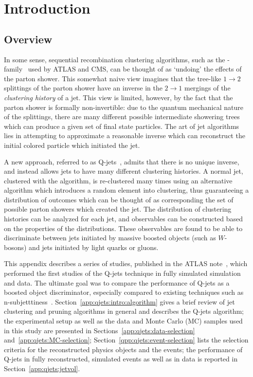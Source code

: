 \label{appendix:qjets}

\section{Introduction}

\subsection{Overview}
\label{app:qjets:intro:overview}

In some sense, sequential recombination clustering algorithms, such as the \kt-family~\cite{Ellis:1993tq} used by ATLAS and CMS, can be thought of as `undoing' the effects of the parton shower. This somewhat naive view imagines that the tree-like $1\rightarrow2$ splittings of the parton shower have an inverse in the $2\rightarrow1$ mergings of the \textit{clustering history} of a jet. This view is limited, however, by the fact that the parton shower is formally non-invertible: due to the quantum mechanical nature of the splittings, there are many different possible intermediate showering trees which can produce a given set of final state particles. The art of jet algorithms lies in attempting to approximate a reasonable inverse which can reconstruct the initial colored particle which initiated the jet.

A new approach, referred to as Q-jets~\cite{Ellis:2012sn}, admits that there is no unique inverse, and instead allows jets to have many different clustering histories. A normal jet, clustered with the \antikt algorithm, is re-clustered many times using an alternative algorithm which introduces a random element into clustering, thus guaranteeing a distribution of outcomes which can be thought of as corresponding the set of possible parton showers which created the jet. The distribution of clustering histories can be analyzed for each jet, and observables can be constructed based on the properties of the distributions. These observables are found to be able to discriminate between jets initiated by massive boosted objects (such as $W$-bosons) and jets initiated by light quarks or gluons.

This appendix describes a series of studies, published in the ATLAS note~\cite{CITEME}, which performed the first studies of the Q-jets technique in fully simulated simulation and data. The ultimate goal was to compare the performance of Q-jets as a boosted object discriminator, especially compared to existing techniques such as n-subjetttiness~\cite{again}. Section~\ref{app:qjets:intro:algorithm} gives a brief review of jet clustering and pruning algorithms in general and describes the Q-jets algorithm; the experimental setup as well as the data and Monte Carlo (MC) samples used in this study are presented in Sections~\ref{app:qjets:data-selection} and~\ref{app:qjets:MC-selection}; Section~\ref{qpp:qjets:event-selection} lists the selection criteria for the reconstructed physics objects and the events; the performance of Q-jets in fully reconstructed, simulated events as well as in data is reported in Section~\ref{app:qjets:jetvol}.

